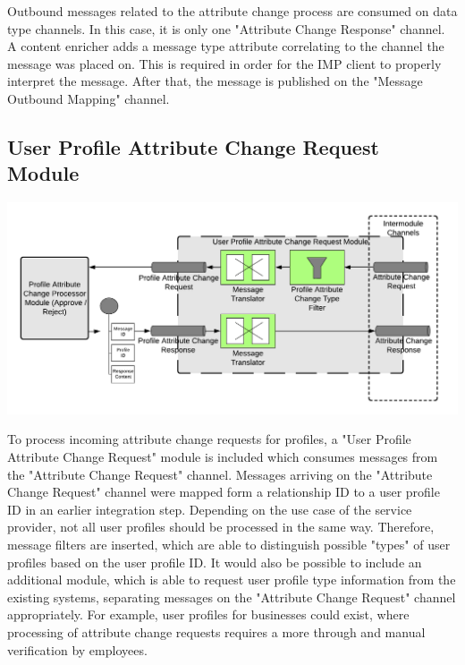 Outbound messages related to the attribute change process are consumed on data type channels. In this case, it is only one "Attribute Change Response" channel. A content enricher adds a message type attribute correlating to the channel the message was placed on. This is required in order for the IMP client to properly interpret the message. After that, the message is published on the "Message Outbound Mapping" channel.

\subsection{User Profile Attribute Change Request Module}

\begin{center}
    \includegraphics[scale=0.6]{Diagrams/Integration Architecture 1/Technological Integration/12. Attribute Change Request Module.pdf}
\end{center}

To process incoming attribute change requests for profiles, a "User Profile Attribute Change Request" module is included which consumes messages from the "Attribute Change Request" channel. Messages arriving on the "Attribute Change Request" channel were mapped form a relationship ID to a user profile ID in an earlier integration step. Depending on the use case of the service provider, not all user profiles should be processed in the same way. Therefore, message filters are inserted, which are able to distinguish possible "types" of user profiles based on the user profile ID. It would also be possible to include an additional module, which is able to request user profile type information from the existing systems, separating messages on the "Attribute Change Request" channel appropriately. For example, user profiles for businesses could exist, where processing of attribute change requests requires a more through and manual verification by employees. 

